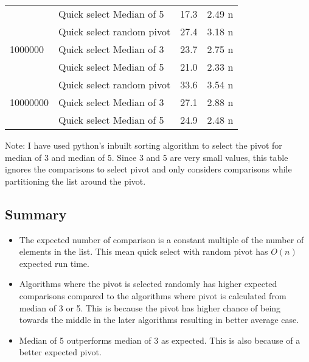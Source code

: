 \documentclass{homeworg}
\begin{document}
\begin{table}[htbp]
\begin{tabular}{llrr}
       & Quick select Median of 5 &                 17.3 &               2.49 n \\
\cline{1-4}
\multirow{3}{*}{1000000} & Quick select random pivot &                 27.4 &               3.18 n \\
        & Quick select Median of 3 &                 23.7 &               2.75 n \\
        & Quick select Median of 5 &                 21.0 &               2.33 n \\
\cline{1-4}
\multirow{3}{*}{10000000} & Quick select random pivot &                 33.6 &               3.54 n \\
         & Quick select Median of 3 &                 27.1 &               2.88 n \\
         & Quick select Median of 5 &                 24.9 &               2.48 n \\

\bottomrule
\end{tabular}
\end{table}
Note: I have used python's inbuilt sorting algorithm to select the pivot for median of 3 and median of 5. Since 3 and 5 are very small values, this table ignores the comparisons to select pivot and only considers comparisons while partitioning the list around the pivot. 

\subsection{Summary}
\begin{itemize}
    \item The expected number of comparison is a constant multiple of the number of elements in the list. This mean quick select with random pivot has $O(n)$ expected run time.
    \item Algorithms where the pivot is selected randomly has higher expected comparisons compared to the algorithms where pivot is calculated from median of 3 or 5. This is because the pivot has higher chance of being towards the middle in the later algorithms resulting in better average case.
    \item Median of 5 outperforms median of 3 as expected. This is also because of a better expected pivot. 
\end{itemize}
\end{document}
